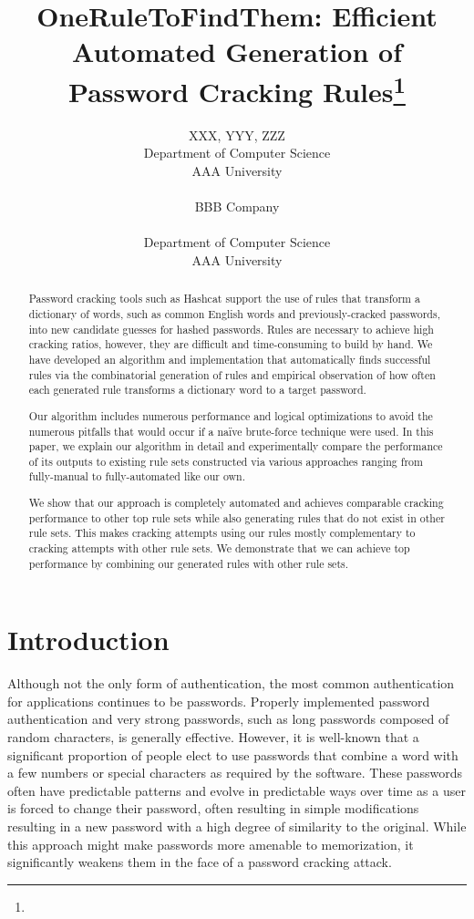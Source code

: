 \documentclass{article}
\title{OneRuleToFindThem: Efficient Automated Generation of Password Cracking Rules\footnote{\protect}
}
\author{
    XXX\affmark[1], YYY\affmark[2], ZZZ\affmark[3]\\
\affmark[1]Department of Computer Science\\
AAA University\\
\email{III@III.III}\\
\affmark[2]
BBB Company\\
\email{JJJ@JJJ.JJJ}\\
\affmark[3]Department of Computer Science\\
AAA University\\
\email{LLL@LLL.LLL}
}
\begin{document}
\maketitle

\begin{abstract}
Password cracking tools such as Hashcat support the use of rules that transform
a dictionary of words, such as common English words and previously-cracked
passwords, into new candidate guesses for hashed passwords. Rules are necessary
to achieve high cracking ratios, however, they are difficult and time-consuming
to build by hand. We have developed an algorithm and implementation that
automatically finds successful rules via the combinatorial generation of rules
and empirical observation of how often each generated rule transforms a
dictionary word to a target password.

Our algorithm includes numerous performance and logical optimizations to avoid the
numerous pitfalls that would occur if a na\"ive brute-force technique were used.
In this paper, we explain our algorithm in detail and experimentally compare the
performance of its outputs to existing rule sets constructed via various
approaches ranging from fully-manual to fully-automated like our own.

We show that our approach is completely automated and achieves comparable
cracking performance to other top rule sets while also generating rules that do
not exist in other rule sets. This makes cracking attempts using our rules
mostly complementary to cracking attempts with other rule sets. We
demonstrate that we can achieve top performance
by combining our generated rules with other rule sets.
\end{abstract}

\section{Introduction}

Although not the only form of authentication, the most common 
authentication for applications continues to be passwords. Properly implemented password
authentication and very strong passwords,
such as long passwords composed of random characters, is
generally effective. However, it is well-known that a significant proportion of
people elect to use passwords that combine a word with a few numbers or
special characters as required by the software. These passwords often
have predictable patterns and evolve in predictable ways over time as a user is
forced to change their password, often resulting in simple modifications
resulting in a new password with a high degree of similarity to the
original\autocite{hanamsagar2018leveraging}. While this approach might make
passwords more amenable to memorization, it significantly weakens them in the
face of a password cracking attack.
\end{document}
